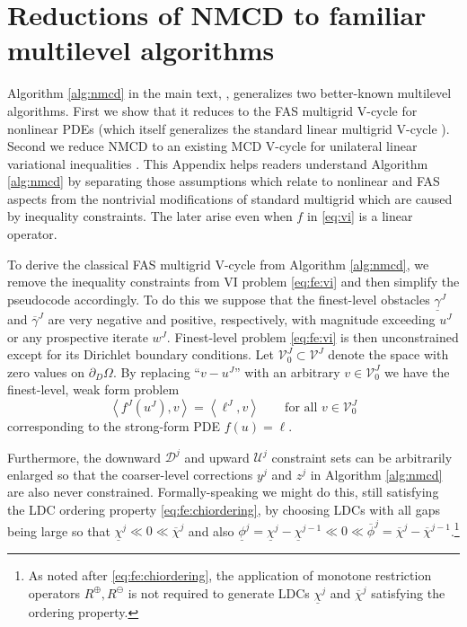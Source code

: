 \documentclass[letterpaper,final,12pt,reqno]{amsart}
\theoremstyle{cstyle}
\theoremstyle{cstyle*}
\theoremstyle{dstyle}
\numberwithin{equation}{section}
\numberwithin{figure}{section}
\numberwithin{table}{section}
\numberwithin{theorem}{section}
\newcommand{\ip}[2]{\left<#1,#2\right>}
\newcommand{\maxR}{R^{\bm{\oplus}}}
\newcommand{\minR}{R^{\bm{\ominus}}}
\begin{document}
\appendix
\section{Reductions of NMCD to familiar multilevel algorithms}

Algorithm \ref{alg:nmcd} in the main text, , generalizes two better-known multilevel algorithms.  First we show that it reduces to the FAS multigrid V-cycle for nonlinear PDEs (which itself generalizes the standard linear multigrid V-cycle \cite{Trottenbergetal2001}).  Second we reduce NMCD to an existing MCD V-cycle for unilateral linear variational inequalities \cite{GraeserKornhuber2009}.  This Appendix helps readers understand Algorithm \ref{alg:nmcd} by separating those assumptions which relate to nonlinear and FAS aspects from the nontrivial modifications of standard multigrid which are caused by inequality constraints.  The later arise even when $f$ in \eqref{eq:vi} is a linear operator.

To derive the classical FAS multigrid V-cycle from Algorithm \ref{alg:nmcd}, we remove the inequality constraints from VI problem \eqref{eq:fe:vi} and then simplify the pseudocode accordingly.  To do this we suppose that the finest-level obstacles $\underline{\gamma}^J$ and $\overline{\gamma}^J$ are very negative and positive, respectively, with magnitude exceeding $u^J$ or any prospective iterate $w^J$.  Finest-level problem \eqref{eq:fe:vi} is then unconstrained except for its Dirichlet boundary conditions.  Let $\mathcal{V}_0^J \subset \mathcal{V}^J$ denote the space with zero values on $\partial_D\Omega$.  By replacing ``$v-u^J$'' with an arbitrary $v \in \mathcal{V}_0^J$ we have the finest-level, weak form problem
\begin{equation}
\ip{f^J(u^J)}{v} = \ip{\ell^J}{v} \qquad \text{for all } v\in \mathcal{V}_0^J \label{eq:app:fas:pde}
\end{equation}
corresponding to the strong-form PDE $f(u)=\ell$.

Furthermore, the downward $\mathcal{D}^j$ and upward $\mathcal{U}^j$ constraint sets can be arbitrarily enlarged so that the coarser-level corrections $y^j$ and $z^j$ in Algorithm \ref{alg:nmcd} are also never constrained.  Formally-speaking we might do this, still satisfying the LDC ordering property \eqref{eq:fe:chiordering}, by choosing LDCs with all gaps being large so that $\underline{\chi}^j \ll 0 \ll \overline{\chi}^j$ and also $\underline{\phi}^j = \underline{\chi}^j - \underline{\chi}^{j-1} \ll 0 \ll \overline{\phi}^j = \overline{\chi}^j - \overline{\chi}^{j-1}$.\footnote{As noted after \eqref{eq:fe:chiordering}, the application of monotone restriction operators $\maxR,\minR$ is not required to generate LDCs $\underline{\chi}^j$ and $\overline{\chi}^j$ satisfying the ordering property.}
\end{document}
